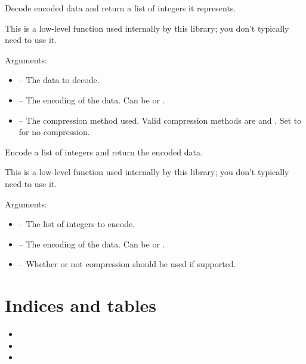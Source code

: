 \documentclass[letterpaper,10pt,english]{sphinxmanual}
\begin{document}
\begin{fulllineitems}
\label{index:tmx.data_decode}
Decode encoded data and return a list of integers it represents.

This is a low-level function used internally by this library; you
don't typically need to use it.

Arguments:
\begin{itemize}
\item {} 
 -- The data to decode.

\item {} 
 -- The encoding of the data.  Can be  or
.

\item {} 
 -- The compression method used.  Valid compression
methods are  and .  Set to  for
no compression.

\end{itemize}

\end{fulllineitems}


\begin{fulllineitems}
\label{index:tmx.data_encode}
Encode a list of integers and return the encoded data.

This is a low-level function used internally by this library; you
don't typically need to use it.

Arguments:
\begin{itemize}
\item {} 
 -- The list of integers to encode.

\item {} 
 -- The encoding of the data.  Can be  or
.

\item {} 
 -- Whether or not compression should be used if
supported.

\end{itemize}

\end{fulllineitems}



\chapter{Indices and tables}
\label{index:indices-and-tables}\begin{itemize}
\item {} 

\item {} 

\item {} 

\end{itemize}
\end{document}

